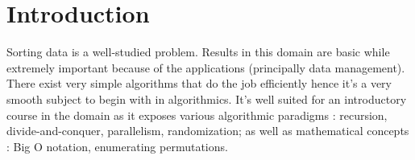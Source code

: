 \section{Introduction}
\label{tree:sorting:intro}

Sorting data is a well-studied problem. Results in this domain are basic while extremely important because of the applications (principally data management).
There exist very simple algorithms that do the job efficiently hence it's a very smooth subject to begin with in algorithmics.
It's well suited for an introductory course in the domain as it exposes various algorithmic paradigms : recursion, divide-and-conquer, parallelism, randomization; as well as mathematical concepts : Big O notation, enumerating permutations.
